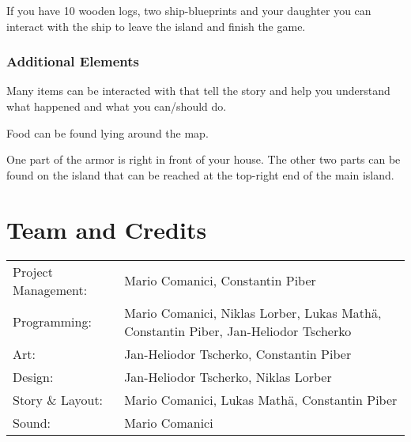 \documentclass[a4paper]{scrreprt}
\begin{document}
If you have 10 wooden logs, two ship-blueprints and your daughter you can interact with the ship to leave the island and finish the game.

\subsection{Additional Elements}

Many items can be interacted with that tell the story and help you understand what happened and what you can/should do.
\bigskip

Food can be found lying around the map.

One part of the armor is right in front of your house. The other two parts can be found on the island that can be reached at the top-right end of the main island.





\chapter{Team and Credits}

\begin{tabularx}{0.9\textwidth}{lX}
    Project Management: & Mario Comanici, Constantin Piber \\
    Programming: & Mario Comanici, Niklas Lorber, Lukas Mathä, Constantin Piber, Jan-Heliodor Tscherko \\
    Art: & Jan-Heliodor Tscherko, Constantin Piber \\
    Design: & Jan-Heliodor Tscherko, Niklas Lorber \\
    Story \& Layout: & Mario Comanici, Lukas Mathä, Constantin Piber \\
    Sound: & Mario Comanici  \\
\end{tabularx}

\printbibliography{}
\end{document}
